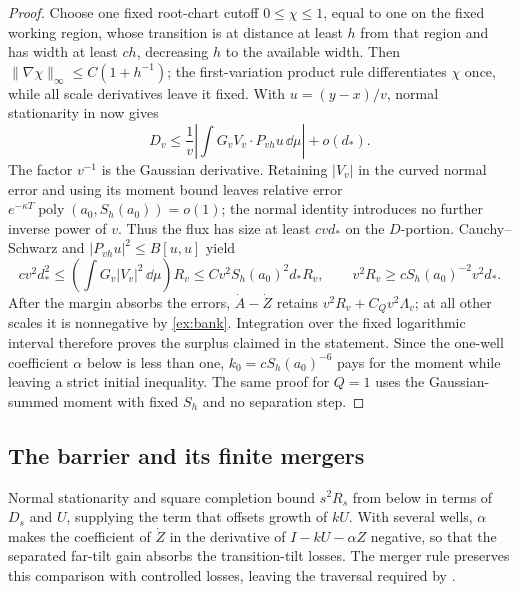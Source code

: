 \begin{proof}
Choose one fixed root-chart cutoff \(0\le\chi\le1\), equal to one on
the fixed working region, whose transition is at distance at least
\(h\) from that region and has width at least \(ch\), decreasing \(h\)
to the available width. Then
\(\|\nabla\chi\|_\infty\le C(1+h^{-1})\); the first-variation product
rule differentiates \(\chi\) once, while all scale derivatives leave
it fixed.
With \(u=(y-x)/v\), normal stationarity in 
now gives
\[
 D_v\le \frac1v
       \left|\int G_v V_v\cdot P_{vh}u\,\dd\mu\right|+o(d_*).
\]
The factor \(v^{-1}\) is the Gaussian derivative. Retaining
\(|V_v|\) in the curved normal error and using its moment bound
leaves relative error
\(e^{-\kappa T}\operatorname{poly}(a_0,S_h(a_0))=o(1)\);
the normal identity introduces no further inverse power of \(v\).
Thus the flux has size at least \(cvd_*\) on the \(D\)-portion.
Cauchy--Schwarz and \(|P_{vh}u|^2\le B[u,u]\) yield
\[
 c v^2d_*^2
 \le \left(\int G_v|V_v|^2\,\dd\mu\right)R_v
 \le Cv^2S_h(a_0)^2d_*R_v,
 \qquad
 v^2R_v\ge cS_h(a_0)^{-2}v^2d_*.
\]
After the margin absorbs the errors, \(\dot A-\dot Z\) retains
\(v^2R_v+C_Qv^2\Lambda_v\); at all other scales it is nonnegative
by \eqref{ex:bank}. Integration over the fixed logarithmic interval
therefore proves the surplus claimed in the statement. Since the
one-well coefficient \(\alpha\)
below is less than one, \(k_0=cS_h(a_0)^{-6}\) pays for the moment
while leaving a strict initial inequality. The same proof for
\(Q=1\) uses the Gaussian-summed moment with fixed \(S_h\) and no
separation step.
\end{proof}

\subsection{The barrier and its finite mergers}

Normal stationarity and square completion bound \(s^2R_s\) from below
in terms of \(D_s\) and \(U\), supplying the term that offsets growth
of \(kU\). With several wells, \(\alpha\) makes the coefficient of
\(\dot Z\) in the derivative of \(I-kU-\alpha Z\) negative, so that
the separated far-tilt gain absorbs the transition-tilt
losses. The merger rule preserves this comparison with controlled losses,
leaving the traversal required by .

